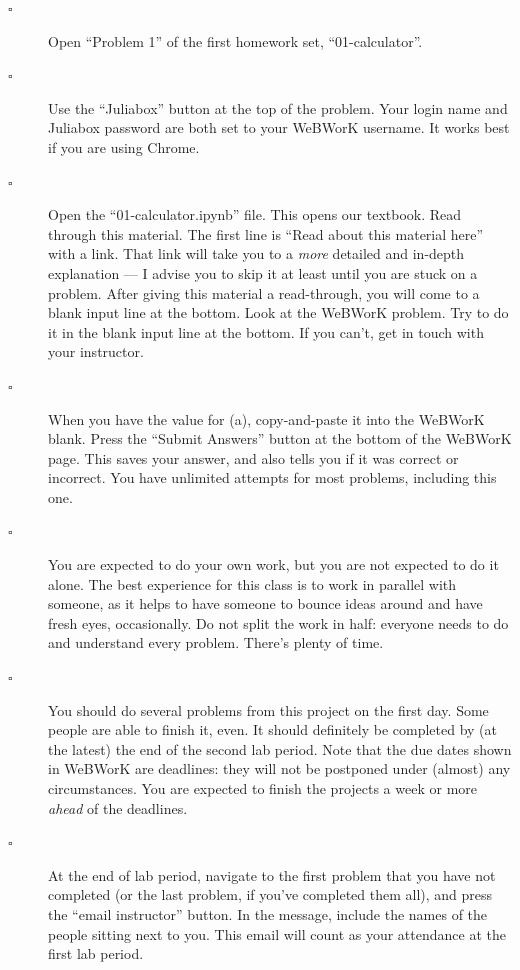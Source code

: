 \documentclass[12pt,answers]{book}
\begin{document}
\begin{description}
  \item[$\square$] Open ``Problem 1'' of the first homework set, ``01-calculator''.
  \item[$\square$] Use the ``Juliabox'' button at the top of the problem. Your login name and Juliabox password are both set to your WeBWorK username. It works best if you are using Chrome.
  \item[$\square$] Open the ``01-calculator.ipynb'' file. This opens our textbook. Read through this material. The first line is ``Read about this material here'' with a link. That link will take you to a \emph{more} detailed and in-depth explanation --- I advise you to skip it at least until you are stuck on a problem. After giving this material a read-through, you will come to a blank input line at the bottom. Look at the WeBWorK problem. Try to do it in the blank input line at the bottom. If you can't, get in touch with your instructor.
  \item[$\square$] When you have the value for (a), copy-and-paste it into the WeBWorK blank. Press the ``Submit Answers'' button at the bottom of the WeBWorK page. This saves your answer, and also tells you if it was correct or incorrect. You have unlimited attempts for most problems, including this one.
  \item[$\square$] You are expected to do your own work, but you are not expected to do it alone. The best experience for this class is to work in parallel with someone, as it helps to have someone to bounce ideas around and have fresh eyes, occasionally. Do not split the work in half: everyone needs to do and understand every problem. There's plenty of time.
  \item[$\square$] You should do several problems from this project on the first day. Some people are able to finish it, even. It should definitely be completed by (at the latest) the end of the second lab period. Note that the due dates shown in WeBWorK are deadlines: they will not be postponed under (almost) any circumstances. You are expected to finish the projects a week or more \emph{ahead} of the deadlines.
  \item[$\square$] At the end of lab period, navigate to the first problem that you have not completed (or the last problem, if you've completed them all), and press the ``email instructor'' button. In the message, include the names of the people sitting next to you. This email will count as your attendance at the first lab period.
\end{description}
\end{document}
